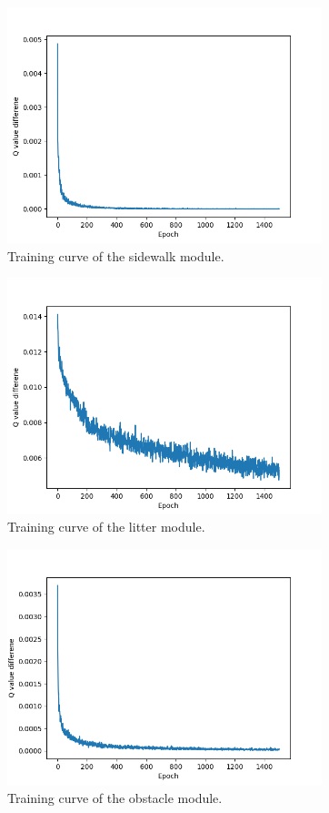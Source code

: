 \documentclass[conference]{IEEEtran}
\begin{document}
\begin{figure}[!t]
	\centering
	\includegraphics[width=3.6in]{sidewalk.png}	
	\caption{Training curve of the sidewalk module.}
	\label{fig:sidewalk}
\end{figure}

\begin{figure}[!t]
	\centering
	\includegraphics[width=3.6in]{litter.png}	
	\caption{Training curve of the litter module.}
	\label{fig:litter}
\end{figure}


\begin{figure}[!t]
	\centering
	\includegraphics[width=3.6in]{obstacle.png}	
	\caption{Training curve of the obstacle module.}
	\label{fig:obstacle}
\end{figure}
\end{document}

